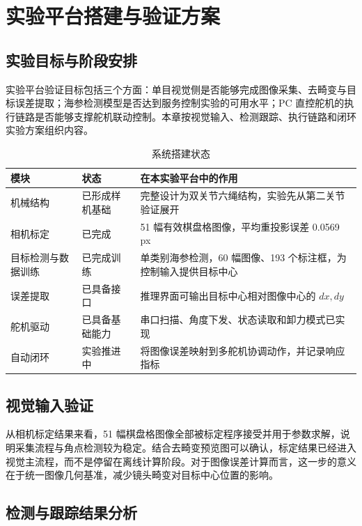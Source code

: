 \documentclass[UTF8,zihao=-4,oneside]{ctexrep}
\begin{document}
\chapter{实验平台搭建与验证方案}

\section{实验目标与阶段安排}

实验平台验证目标包括三个方面：单目视觉侧是否能够完成图像采集、去畸变与目标误差提取；海参检测模型是否达到服务控制实验的可用水平；PC 直控舵机的执行链路是否能够支撑舵机联动控制。本章按视觉输入、检测跟踪、执行链路和闭环实验方案组织内容。

\begin{table}[H]
  \centering
  \caption{系统搭建状态}
  \label{tab:system-status}
  \begin{tabularx}{\textwidth}{>{\raggedright\arraybackslash}p{} >{\raggedright\arraybackslash}p{} X}
    \toprule
    模块 & 状态 & 在本实验平台中的作用 \\
    \midrule
    机械结构 & 已形成样机基础 & 完整设计为双关节六绳结构，实验先从第二关节验证展开 \\
    相机标定 & 已完成 & 51 幅有效棋盘格图像，平均重投影误差 0.0569 px \\
    目标检测与数据训练 & 已完成训练 & 单类别海参检测，60 幅图像、193 个标注框，为控制输入提供目标中心 \\
    误差提取 & 已具备接口 & 推理界面可输出目标中心相对图像中心的 \(dx,dy\) \\
    舵机驱动 & 已具备基础能力 & 串口扫描、角度下发、状态读取和卸力模式已实现 \\
    自动闭环 & 实验推进中 & 将图像误差映射到多舵机协调动作，并记录响应指标 \\
    \bottomrule
  \end{tabularx}
\end{table}

\section{视觉输入验证}

从相机标定结果来看，51 幅棋盘格图像全部被标定程序接受并用于参数求解，说明采集流程与角点检测较为稳定。结合去畸变预览图可以确认，标定结果已经进入视觉主流程，而不是停留在离线计算阶段。对于图像误差计算而言，这一步的意义在于统一图像几何基准，减少镜头畸变对目标中心位置的影响。

\section{检测与跟踪结果分析}
\end{document}
